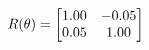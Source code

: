\documentclass[preview]{standalone}
\begin{document}
\begin{align*}
\special{dvisvgm:raw <g id='unique000'>}R(\theta) = \begin{bmatrix}1.00 & -0.05\\0.05 & 1.00\end{bmatrix}\special{dvisvgm:raw </g>}
\end{align*}
\end{document}

